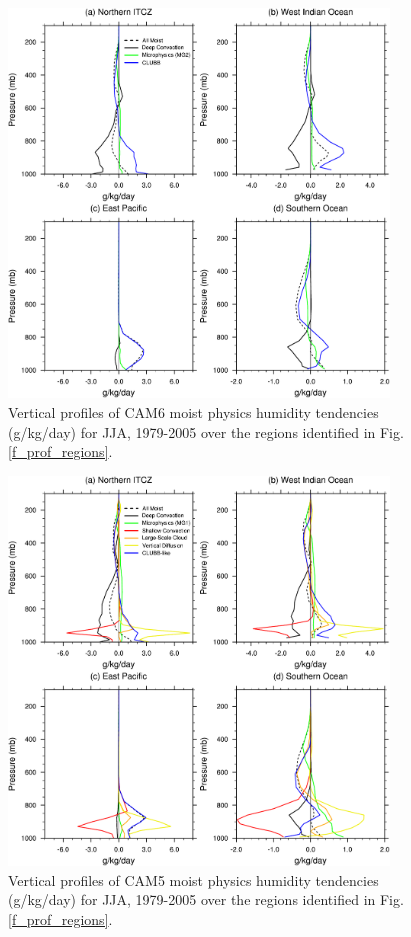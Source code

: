 \clearpage
\begin{figure}[t]
  \begin{center}
    \includegraphics[width=0.9\textwidth,angle=0.]{./figs/f_vtend_DQDT_CAM6.pdf}
  \end{center}
  \caption{Vertical profiles of CAM6 moist physics humidity tendencies (g/kg/day) for JJA, 1979-2005 over the regions identified in Fig.\ref{f_prof_regions}.} 
\label{f_vtend_DQDT_CAM6}
\end{figure} 

\clearpage
\begin{figure}[t]
  \begin{center}
    \includegraphics[width=0.9\textwidth,angle=0.]{./figs/f_vtend_DQDT_CAM5.pdf}
  \end{center}
  \caption{Vertical profiles of CAM5 moist physics humidity tendencies (g/kg/day) for JJA, 1979-2005 over the regions identified in Fig. \ref{f_prof_regions}.} 
\label{f_vtend_DQDT_CAM5}
\end{figure} 


